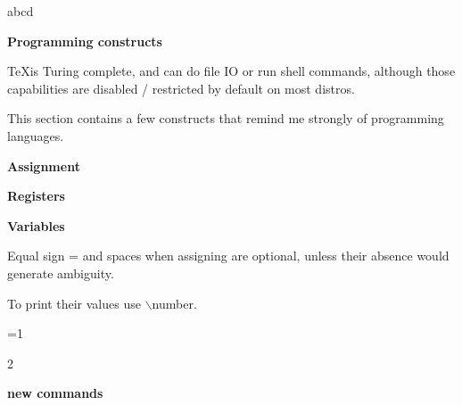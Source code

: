 \def\bs{$\backslash$}
\def\bo{$\{$}
\def\bc{$\}$}
\def\code#1{#1}
\def\section#1{{\bf #1}}
\def\subsection#1{{\bf #1}}
\def\subsubsection#1{{\bf #1}}

abcd

\section{Programming constructs}

  \TeX is Turing complete, and can do file IO or run shell commands, although those capabilities are disabled / restricted by default on most distros.

  This section contains a few constructs that remind me strongly of programming languages.

  \subsection{Assignment}

  \subsection{Registers}

  \subsection{Variables}

    Equal sign = and spaces when assigning are optional, unless their absence would generate ambiguity.

    To print their values use \bs number.

    =1

    \number{}

     2

    \number{}


  \subsection{new commands}

